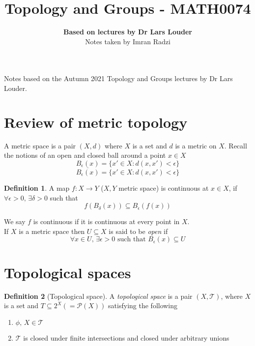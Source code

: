 \documentclass[a4paper,14pt]{extarticle}
\theoremstyle{definition}
\newtheorem*{definition}{Definition}
\begin{document}
\title{\textbf{Topology and Groups - MATH0074}}
\author{\textbf{Based on lectures by Dr Lars Louder}\\ Notes taken by Imran Radzi}
\date{}
\maketitle

Notes based on the Autumn 2021 Topology and Groups lectures by Dr Lars Louder.

\begingroup
\let\cleardoublepage\clearpage
\tableofcontents
\endgroup
\newpage
{}

\section{Review of metric topology}

A metric space is a pair $(X, d)$ where $X$ is a set and $d$ is a metric on $X$. Recall the notions of an open and closed ball around a point $x\in X$
\[B_\epsilon(x)=\{x'\in X:d(x,x')<\epsilon\}\] \[\overline{B_\epsilon(x)}=\{x'\in X:d(x,x')<\epsilon\}\]

\begin{definition}
	A map $f:X\to Y$ ($X,Y$ metric space) is continuous at $x\in X$, if $\forall\epsilon>0,\,\exists\delta>0$ such that \[f(B_\delta(x))\subseteq B_\epsilon(f(x))\]
\end{definition}
We say $f$ is continuous if it is continuous at every point in $X$. \\

If $X$ is a metric space then $U\subseteq X$ is said to be \emph{open} if \[\forall x\in U,\,\exists\epsilon>0\text{ such that } B_\epsilon(x)\subseteq U\]

\section{Topological spaces}
\begin{definition}[Topological space]
	A \emph{topological space} is a pair $(X,\mathcal{T})$, where $X$ is a set and $T\subseteq 2^X (=\mathcal{P}(X))$ satisfying the following
	\begin{enumerate}
		\item $\phi,\,X\in\mathcal{T}$
		\item $\mathcal{T}$ is closed under finite intersections and closed under arbitrary unions
	\end{enumerate}
\end{definition}
\end{document}
